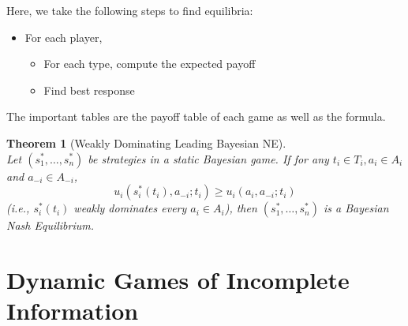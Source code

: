 \documentclass[12pt]{article}
\newtheorem{theorem}{Theorem}[section]
\theoremstyle{definition}
\begin{document}
Here, we take the following steps to find equilibria:
\begin{itemize}
  \item For each player,
  \begin{itemize}
    \item For each type, compute the expected payoff
    \item Find best response
  \end{itemize}
\end{itemize}
The important tables are the payoff table of each game as well as the formula.
\begin{theorem}[Weakly Dominating Leading Bayesian NE]
\hfill\\\normalfont Let $(s_1^\ast, \ldots, s_n^\ast)$ be strategies in a static Bayesian game. If for any $t_i\in T_i, a_i\in A_i$ and $a_{-i}\in A_{-i}$,
\[
u_i(s_i^\ast(t_i), a_{-i}; t_i) \geq u_i(a_i, a_{-i}; t_i)
\]
(i.e., $s_i^\ast(t_i)$ weakly dominates every $a_i\in A_i$), then $(s_1^\ast, \ldots, s_n^\ast)$ is a Bayesian Nash Equilibrium.
\end{theorem}
\clearpage
\section{Dynamic Games of Incomplete Information}
\end{document}
